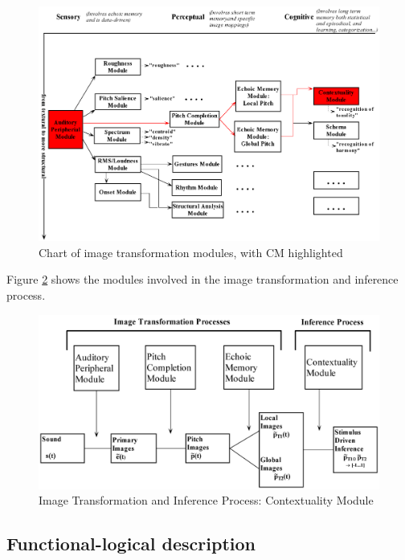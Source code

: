 \begin{figure}[h]
    \centering
    \includegraphics[width=\textwidth]{Graphics/ModulesCM}
    \caption{Chart of image transformation modules, with CM highlighted}
    \label{Fig:ModulesCM}
\end{figure}

Figure \ref{Fig:CMModule} shows the modules involved in the image
transformation and inference process.
\begin{figure}[h]
    \centering
    \includegraphics[width=\IPEMDefaultFigureWidth]{Graphics/CMModule}
    \caption{Image Transformation and Inference Process: Contextuality Module}
    \label{Fig:CMModule}
\end{figure}


\subsection{Functional-logical description}

